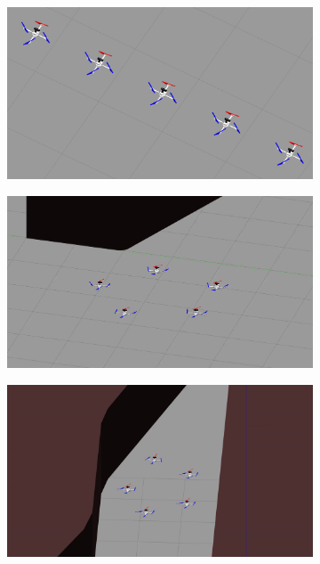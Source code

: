 \begin{figure}
    \centering
    \begin{subfigure}[b]{0.325\textwidth}
    \includegraphics[width=\textwidth]{paper3/images/gazebo_01.png}
    \caption{}
    \end{subfigure}
    \begin{subfigure}[b]{0.325\textwidth}
    \includegraphics[width=\textwidth]{paper3/images/gazebo_02.png}
    \caption{}
    \end{subfigure}
    \begin{subfigure}[b]{0.325\textwidth}
    \includegraphics[width=\textwidth]{paper3/images/gazebo_03.png}

\end{subfigure}
\end{figure}
